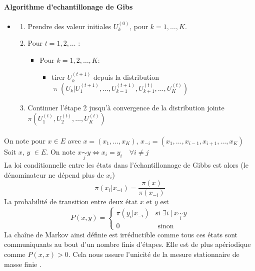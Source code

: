 \documentclass{article}
\theoremstyle{definition}
\theoremstyle{remark}
\begin{document}
\paragraph{Algorithme d'echantillonage de Gibs \\}
\begin{itemize}[label={}]
\item \begin{enumerate}
	\item Prendre des valeur initiales $U^{(0)}_k$, pour $k = 1, \ldots, K$.
	\item Pour $t = 1, 2, \ldots$ :
	\begin{itemize}[label={}]
		\item Pour $k = 1,2, \ldots, K$:
		\begin{itemize}[label={}]
			\item tirer $U_k^{(t+1)}$ depuis la distribution 
			$\operatorname{\pi}(U_{k} | U_{1}^{(t+1)}, \ldots, U_{k-1}^{(t+1)}, U_{k+1}^{(t)}, \ldots, U_{K}^{(t)})$ 
		\end{itemize}
	\end{itemize}
	\item Continuer l'étape 2 jusqu'à convergence de la distribution jointe
	$\pi (U_{1}^{(t)}, U_{2}^{(t)}, \ldots, U_{K}^{(t)})$	
\end{enumerate}
\end{itemize}
\paragraph{}

\paragraph{}
On note pour $x \in E$ avec $x=(x_1,\ldots,x_K)$, $x_{-i} = (x_1, \ldots,x_{i-1},x_{i+1}, \ldots, x_K)$ \\
Soit $x$, $y$ $\in E$. On note $x \underset{j}{\sim} y  \Longleftrightarrow x_{i}=y_{i} \quad \forall i \neq j$ \\
La loi conditionnelle entre les états dans l'échantillonnage de Gibbs est alors (le dénominateur ne dépend plus de $x_i$)
$$
\pi(x_{i} | x_{-i})= \frac{\pi(x)}{\pi(x_{-i})}
$$
La probabilité de transition entre deux état $x$ et $y$ est 
$$
P(x,y)=\left\{\begin{array}{ll}
{\pi(y_{i} | x_{-i})} & {\text{si } \exists i\ |\ x \underset{i}{\sim} y }\\
 {0} & {\text { sinon }}
\end{array}\right.
$$
La chaîne de Markov ainsi définie est irréductible comme tous ces états sont communiquants au bout d'un nombre finis d'étapes.
 Elle est de plus apériodique comme $P(x,x)>0$. Cela nous assure l'unicité de la mesure stationnaire de masse finie \cite{wiki}.
\end{document}
